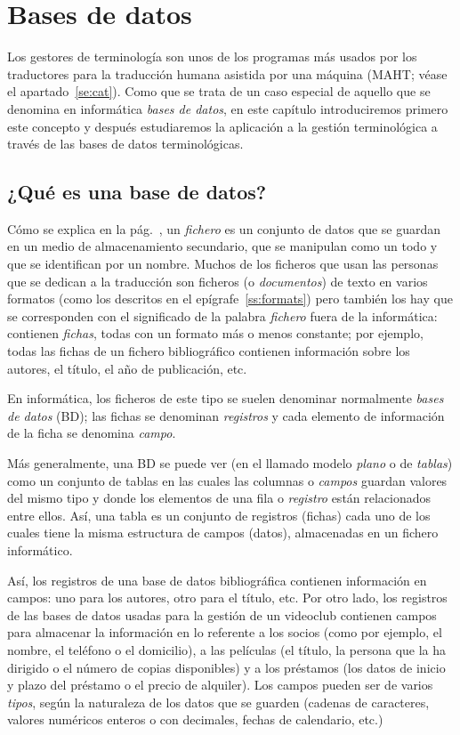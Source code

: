 \chapter{Bases de datos} \label{se:basesdades} 

Los gestores de terminología son unos de los programas más usados por los traductores para la traducción humana asistida por una máquina (MAHT; véase el apartado~\ref{se:cat}). Como que se trata de un caso especial de aquello que se denomina en informática \emph{bases de datos}, en este capítulo introduciremos primero este concepto y después estudiaremos la aplicación a la gestión terminológica a través de las bases de datos terminológicas. 

\section{¿Qué es una base de datos?} 

Cómo se explica en la pág.~\pageref{pg:fitxer}, un \emph{fichero} es un conjunto de datos que se guardan en un medio de almacenamiento secundario, que se manipulan como un todo y que se identifican por un nombre. Muchos de los ficheros que usan las personas que se dedican a la traducción son ficheros (o \emph{documentos}) de texto en varios formatos (como los descritos en el epígrafe~\ref{ss:formats}) pero también los hay que se corresponden con el significado de la palabra \emph{fichero} fuera de la informática: contienen \emph{fichas}, todas con un formato más o menos constante; por ejemplo, todas las fichas de un fichero bibliográfico contienen información sobre los autores, el título, el año de publicación, etc. 

En informática, los ficheros de este tipo se suelen denominar normalmente \emph{bases de datos} (BD); las fichas se denominan \emph{registros} y cada elemento de información de la ficha se denomina \emph{campo}. 

Más generalmente, una BD se puede ver (en el llamado modelo \emph{plano} o de \emph{tablas}) como un conjunto de tablas en las cuales las columnas o \emph{campos} guardan valores del mismo tipo y donde los elementos de una fila o \emph{registro} están relacionados entre ellos. Así, una tabla es un conjunto de registros (fichas) cada uno de los cuales tiene la misma estructura de campos (datos), almacenadas en un fichero informático. 

Así, los registros de una base de datos bibliográfica contienen información en campos: uno para los autores, otro para el título, etc. Por otro lado, los registros de las bases de datos usadas para la gestión de un videoclub contienen campos para almacenar la información en lo referente a los socios (como por ejemplo, el nombre, el teléfono o el domicilio), a las películas (el título, la persona que la ha dirigido o el número de copias disponibles) y a los préstamos (los datos de inicio y plazo del préstamo o el precio de alquiler). Los campos pueden ser de varios \emph{tipos}, según la naturaleza de los datos que se guarden (cadenas de caracteres, valores numéricos enteros o con decimales, fechas de calendario, etc.) 

